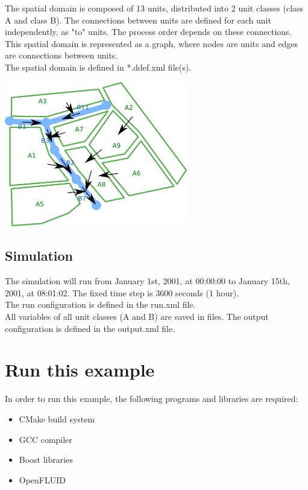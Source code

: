 \documentclass[a4paper,11pt]{article}
\begin{document}
The spatial domain is composed of 13 units, distributed into 2 unit classes 
(class A and class B). The connections between 
units are defined for each unit independently, as "to" units. The process order 
depends on these connections. This spatial domain is represented as a graph, 
where nodes are units and edges are connections between units.\\
The spatial domain is defined in *.ddef.xml file(s). 

\begin{center}
\includegraphics[width=8cm]{openfluid_example-primitives_en/domain.png}
\end{center}


\bigskip
\bigskip

\subsection{Simulation}

The simulation will run from January 1st, 2001, at 00:00:00 to January 15th, 2001, at 08:01:02.
The fixed time step is 3600 seconds (1 hour).\\
\noindent The run configuration is defined in the run.xml file.\\

\noindent All variables of all unit classes (A and B) are saved in files. The output
configuration is defined in the output.xml file.

\bigskip
\bigskip

\section{Run this example}

In order to run this example, the following programs and libraries are required:
\begin{itemize}
\item CMake build system
\item GCC compiler
\item Boost libraries
\item OpenFLUID
\end{itemize}
\end{document}
